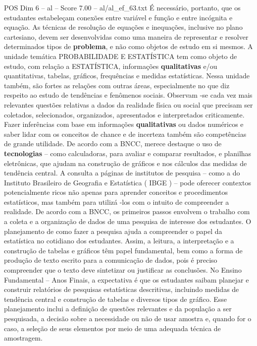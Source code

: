 \begin{textsample}{POS Dim 6 – al – Score 7.00 – al/al\_ef\_63.txt}
É necessário, portanto, que os estudantes estabeleçam conexões entre variável e função e entre incógnita e equação.
As técnicas de resolução de equações e inequações, inclusive no plano cartesiano, devem ser desenvolvidas como uma maneira de representar e resolver determinados tipos de \textbf{problema}, e não como objetos de estudo em si mesmos.
A unidade temática PROBABILIDADE E ESTATÍSTICA tem como objeto de estudo, com relação a ESTATÍSTICA, informações \textbf{qualitativas} e/ou quantitativas, tabelas, gráficos, frequências e medidas estatísticas.
Nessa unidade também, são fortes as relações com outras áreas, especialmente no que diz respeito ao estudo de tendências e fenômenos sociais.
Observam -se cada vez mais relevantes questões relativas a dados da realidade física ou social que precisam ser coletados, selecionados, organizados, apresentados e interpretados criticamente.
Fazer inferências com base em informações \textbf{qualitativas} ou dados numéricos e saber lidar com os conceitos de chance e de incerteza também são competências de grande utilidade.
De acordo com a BNCC, merece destaque o uso de \textbf{tecnologias} – como calculadoras, para avaliar e comparar resultados, e planilhas eletrônicas, que ajudam na construção de gráficos e nos cálculos das medidas de tendência central.
A consulta a páginas de institutos de pesquisa – como a do Instituto Brasileiro de Geografia e Estatística ( IBGE ) – pode oferecer contextos potencialmente ricos não apenas para aprender conceitos e procedimentos estatísticos, mas também para utilizá -los com o intuito de compreender a realidade.
De acordo com a BNCC, os primeiros passos envolvem o trabalho com a coleta e a organização de dados de uma pesquisa de interesse dos estudantes.
O planejamento de como fazer a pesquisa ajuda a compreender o papel da estatística no cotidiano dos estudantes.
Assim, a leitura, a interpretação e a construção de tabelas e gráficos têm papel fundamental, bem como a forma de produção de texto escrito para a comunicação de dados, pois é preciso compreender que o texto deve sintetizar ou justificar as conclusões.
No Ensino Fundamental – Anos Finais, a expectativa é que os estudantes saibam planejar e construir relatórios de pesquisas estatísticas descritivas, incluindo medidas de tendência central e construção de tabelas e diversos tipos de gráfico.
Esse planejamento inclui a definição de questões relevantes e da população a ser pesquisada, a decisão sobre a necessidade ou não de usar amostra e, quando for o caso, a seleção de seus elementos por meio de uma adequada técnica de amostragem.

\end{textsample}
